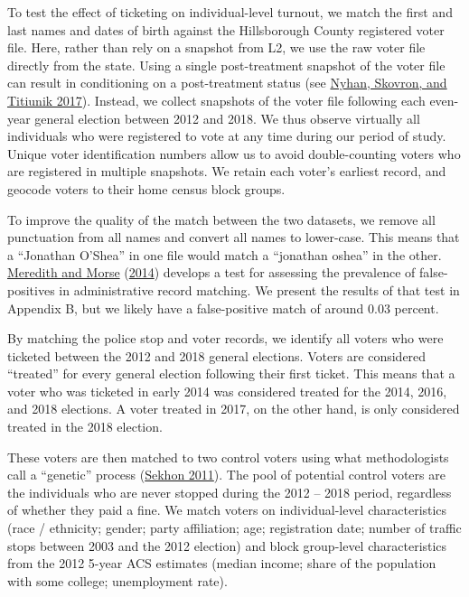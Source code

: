 \documentclass[
  12pt,
]{article}
\begin{document}
To test the effect of ticketing on individual-level turnout, we match the first and last names and dates of birth against the Hillsborough County registered voter file. Here, rather than rely on a snapshot from L2, we use the raw voter file directly from the state. Using a single post-treatment snapshot of the voter file can result in conditioning on a post-treatment status (see \protect\hyperlink{ref-Nyhan2017}{Nyhan, Skovron, and Titiunik 2017}). Instead, we collect snapshots of the voter file following each even-year general election between 2012 and 2018. We thus observe virtually all individuals who were registered to vote at any time during our period of study. Unique voter identification numbers allow us to avoid double-counting voters who are registered in multiple snapshots. We retain each voter's earliest record, and geocode voters to their home census block groups.

To improve the quality of the match between the two datasets, we remove all punctuation from all names and convert all names to lower-case. This means that a ``Jonathan O'Shea'' in one file would match a ``jonathan oshea'' in the other. \protect\hyperlink{ref-Meredith2014}{Meredith and Morse} (\protect\hyperlink{ref-Meredith2014}{2014}) develops a test for assessing the prevalence of false-positives in administrative record matching. We present the results of that test in Appendix B, but we likely have a false-positive match of around 0.03 percent.

By matching the police stop and voter records, we identify all voters who were ticketed between the 2012 and 2018 general elections. Voters are considered ``treated'' for every general election following their first ticket. This means that a voter who was ticketed in early 2014 was considered treated for the 2014, 2016, and 2018 elections. A voter treated in 2017, on the other hand, is only considered treated in the 2018 election.

These voters are then matched to two control voters using what methodologists call a ``genetic'' process (\protect\hyperlink{ref-Sekhon2011}{Sekhon 2011}). The pool of potential control voters are the individuals who are never stopped during the 2012 -- 2018 period, regardless of whether they paid a fine. We match voters on individual-level characteristics (race / ethnicity; gender; party affiliation; age; registration date; number of traffic stops between 2003 and the 2012 election) and block group-level characteristics from the 2012 5-year ACS estimates (median income; share of the population with some college; unemployment rate).
\end{document}

